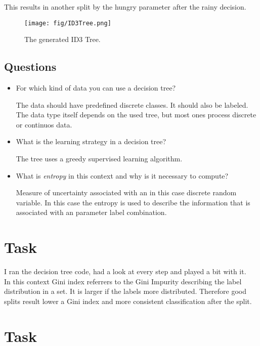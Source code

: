 \documentclass[a4paper, 11pt]{article}
\begin{document}
This results in another split by the hungry parameter after the rainy decision.

\begin{figure}[h!]
    \centering
    \texttt{[image: fig/ID3Tree.png]}
    \caption{The generated ID3 Tree.}
    \label{fig:tree}
\end{figure}

\subsection{Questions}

\begin{itemize}
    \item For which kind of data you can use a decision tree?

    The data should have predefined discrete classes. It should also be labeled.
    The data type itself depends on the used tree, but most ones process discrete or continuos data.

    \item What is the learning strategy in a decision tree?

    The tree uses a greedy supervised learning algorithm.

    \item What is \textit{entropy} in this context and why is it necessary to compute?

    Measure of uncertainty associated with an in this case discrete random variable.
    In this case the entropy is used to describe the information that is associated with an parameter label combination.
\end{itemize}

\section{Task}

I ran the decision tree code, had a look at every step and played a bit with it.
\\
In this context Gini index referrers to the Gini Impurity describing the label distribution in a set.
It is larger if the labels more distributed.
Therefore good splits result lower a Gini index and more consistent classification after the split.

\section{Task}
\end{document}
